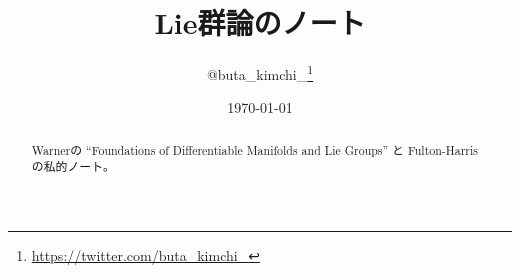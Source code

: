 \documentclass[a4paper]{bxjsarticle}
\title{Lie群論のノート}
\author{@buta\_kimchi\_\thanks{\url{https://twitter.com/buta_kimchi_}}}
\date{\today}
\numberwithin{theorem}{subsection}%
\numberwithin{equation}{section}
\begin{document}
\maketitle
\begin{abstract}
    Warnerの ``Foundations of Differentiable Manifolds and Lie Groups'' と Fulton-Harrisの私的ノート。
\end{abstract}
\tableofcontents

\newpage

\newpage

\end{document}
